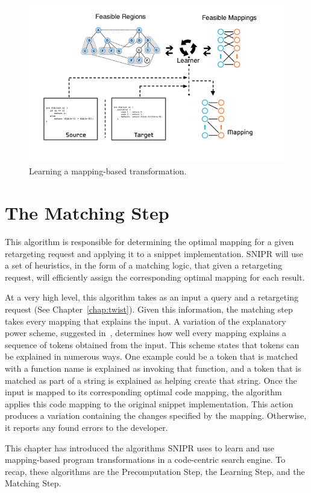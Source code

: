 \begin{figure}[!ht]
    \centering
    \includegraphics[width=\textwidth]{images/mappinggeneration}
    \caption{Learning a mapping-based transformation.}
    \label{fig:mappinggeneration}
\end{figure}

\section{The Matching Step}
\label{sec:matching}

This algorithm is responsible for determining the optimal mapping for a given retargeting request and applying it to a snippet implementation. SNIPR will use a set of heuristics, in the form of a matching logic, that given a retargeting request, will efficiently assign the corresponding optimal mapping for each result. 

At a very high level, this algorithm takes as an input a query and a retargeting request (See Chapter~\ref{chap:twist}). Given this information, the matching step takes every mapping that explains the input. A variation of the explanatory power scheme, suggested in~\cite{Little:2008hr}, determines how well every mapping explains a sequence of tokens obtained from the input. This scheme states that tokens can be explained in numerous ways. One example could be a token that is matched with a function name is explained as invoking that function, and a token that is matched as part of a string is explained as helping create that string. Once the input is mapped to its corresponding optimal code mapping, the algorithm applies this code mapping to the original snippet implementation. This action produces a variation containing the changes specified by the mapping. Otherwise, it reports any found errors to the developer. 

This chapter has introduced the algorithms SNIPR uses to learn and use mapping-based program transformations in a code-centric search engine. To recap, these algorithms are the Precomputation Step, the Learning Step, and the Matching Step.
